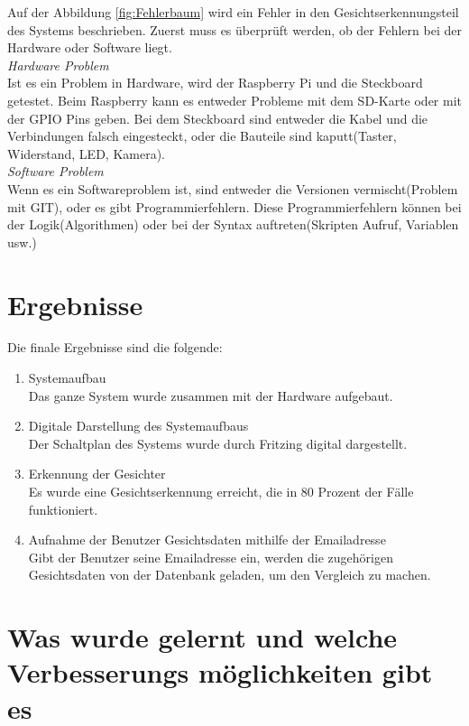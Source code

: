 	Auf der Abbildung \ref{fig:Fehlerbaum} wird ein Fehler in den Gesichtserkennungsteil des Systems beschrieben. Zuerst muss es überprüft werden, ob der Fehlern bei der Hardware oder Software liegt.\\
	
	\textit{Hardware Problem}\\
	Ist es ein Problem in Hardware, wird der Raspberry Pi und die Steckboard getestet. Beim Raspberry kann es entweder Probleme mit dem SD-Karte oder mit der GPIO Pins geben. Bei dem Steckboard sind entweder die Kabel und die Verbindungen falsch eingesteckt, oder die Bauteile sind kaputt(Taster, Widerstand, LED, Kamera).\\
	
	\textit{Software Problem}\\
	Wenn es ein Softwareproblem ist, sind entweder die Versionen vermischt(Problem mit GIT), oder es gibt Programmierfehlern. Diese Programmierfehlern können bei der Logik(Algorithmen) oder bei der Syntax auftreten(Skripten Aufruf, Variablen usw.)
	
	\section{Ergebnisse}
	Die finale Ergebnisse sind die folgende:\\
	\begin{enumerate}
		\item Systemaufbau \\
		Das ganze System wurde zusammen mit der Hardware aufgebaut.
		\item Digitale Darstellung des Systemaufbaus\\
		Der Schaltplan des Systems wurde durch Fritzing digital dargestellt.
		\item Erkennung der Gesichter \\
		Es wurde eine Gesichtserkennung erreicht, die in 80 Prozent der Fälle funktioniert.
		\item Aufnahme der Benutzer Gesichtsdaten mithilfe der Emailadresse\\
		Gibt der Benutzer seine Emailadresse ein, werden die zugehörigen Gesichtsdaten von der Datenbank geladen, um den Vergleich zu machen.
	\end{enumerate}

\section{Was wurde gelernt und 
\textbf{welche
	 Verbesserungs
	 möglichkeiten gibt es}}

